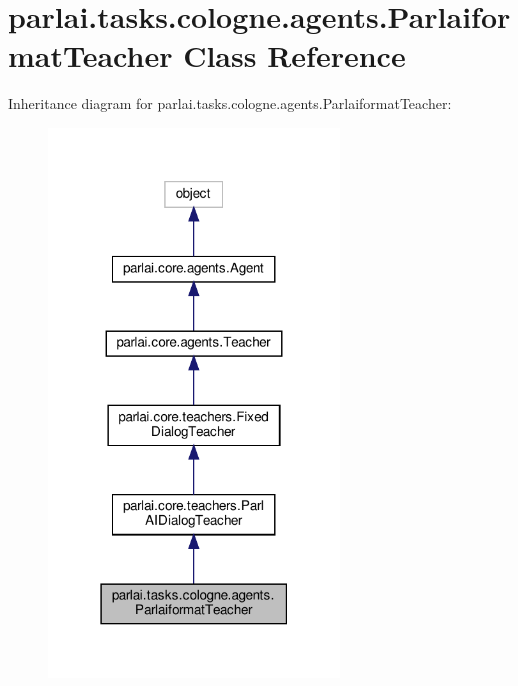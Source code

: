 \hypertarget{classparlai_1_1tasks_1_1cologne_1_1agents_1_1ParlaiformatTeacher}{}\section{parlai.\+tasks.\+cologne.\+agents.\+Parlaiformat\+Teacher Class Reference}
\label{classparlai_1_1tasks_1_1cologne_1_1agents_1_1ParlaiformatTeacher}


Inheritance diagram for parlai.\+tasks.\+cologne.\+agents.\+Parlaiformat\+Teacher\+:
\nopagebreak
\begin{figure}[H]
\begin{center}
\leavevmode
\includegraphics[width=219pt]{dd/d3e/classparlai_1_1tasks_1_1cologne_1_1agents_1_1ParlaiformatTeacher__inherit__graph}
\end{center}
\end{figure}


